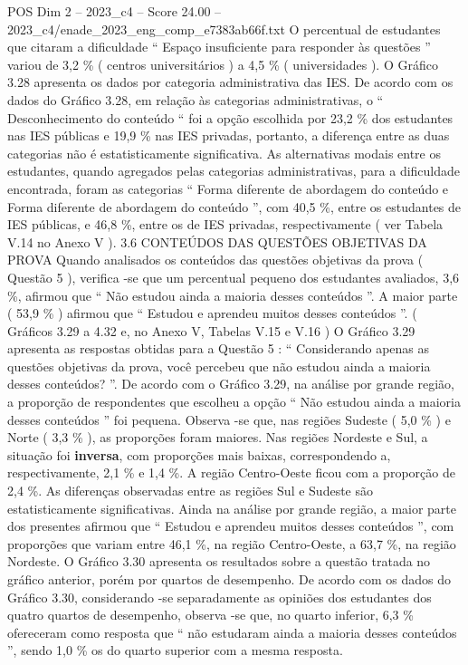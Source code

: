 \begin{textsample}{POS Dim 2 – 2023\_c4 – Score 24.00 – 2023\_c4/enade\_2023\_eng\_comp\_e7383ab66f.txt}
O percentual de estudantes que citaram a dificuldade “ Espaço insuficiente para responder às questões ” variou de 3,2 \% ( centros universitários ) a 4,5 \% ( universidades ).
O Gráfico 3.28 apresenta os dados por categoria administrativa das IES.
De acordo com os dados do Gráfico 3.28, em relação às categorias administrativas, o “ Desconhecimento do conteúdo “ foi a opção escolhida por 23,2 \% dos estudantes nas IES públicas e 19,9 \% nas IES privadas, portanto, a diferença entre as duas categorias não é estatisticamente significativa.
As alternativas modais entre os estudantes, quando agregados pelas categorias administrativas, para a dificuldade encontrada, foram as categorias “ Forma diferente de abordagem do conteúdo e Forma diferente de abordagem do conteúdo ”, com 40,5 \%, entre os estudantes de IES públicas, e 46,8 \%, entre os de IES privadas, respectivamente ( ver Tabela V.14 no Anexo V ). 3.6 CONTEÚDOS DAS QUESTÕES OBJETIVAS DA PROVA Quando analisados os conteúdos das questões objetivas da prova ( Questão 5 ), verifica -se que um percentual pequeno dos estudantes avaliados, 3,6 \%, afirmou que “ Não estudou ainda a maioria desses conteúdos ”.
A maior parte ( 53,9 \% ) afirmou que “ Estudou e aprendeu muitos desses conteúdos ”. ( Gráficos 3.29 a 4.32 e, no Anexo V, Tabelas V.15 e V.16 ) O Gráfico 3.29 apresenta as respostas obtidas para a Questão 5 : “ Considerando apenas as questões objetivas da prova, você percebeu que não estudou ainda a maioria desses conteúdos? ”.
De acordo com o Gráfico 3.29, na análise por grande região, a proporção de respondentes que escolheu a opção “ Não estudou ainda a maioria desses conteúdos ” foi pequena.
Observa -se que, nas regiões Sudeste ( 5,0 \% ) e Norte ( 3,3 \% ), as proporções foram maiores.
Nas regiões Nordeste e Sul, a situação foi \textbf{inversa}, com proporções mais baixas, correspondendo a, respectivamente, 2,1 \% e 1,4 \%.
A região Centro-Oeste ficou com a proporção de 2,4 \%.
As diferenças observadas entre as regiões Sul e Sudeste são estatisticamente significativas.
Ainda na análise por grande região, a maior parte dos presentes afirmou que “ Estudou e aprendeu muitos desses conteúdos ”, com proporções que variam entre 46,1 \%, na região Centro-Oeste, a 63,7 \%, na região Nordeste.
O Gráfico 3.30 apresenta os resultados sobre a questão tratada no gráfico anterior, porém por quartos de desempenho.
De acordo com os dados do Gráfico 3.30, considerando -se separadamente as opiniões dos estudantes dos quatro quartos de desempenho, observa -se que, no quarto inferior, 6,3 \% ofereceram como resposta que “ não estudaram ainda a maioria desses conteúdos ”, sendo 1,0 \% os do quarto superior com a mesma resposta.

\end{textsample}
